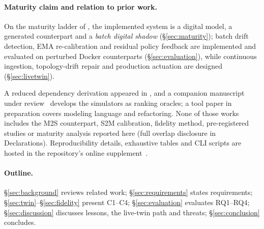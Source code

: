\paragraph{Maturity claim and relation to prior work.} On the maturity ladder of \citet{kritzinger2018digital}, the implemented system is a digital model, a generated counterpart and a \emph{batch digital shadow} (\S\ref{sec:maturity}); batch drift detection, EMA re-calibration and residual policy feedback are implemented and evaluated on perturbed Docker counterparts (\S\ref{sec:evaluation}), while continuous ingestion, topology-drift repair and production actuation are designed (\S\ref{sec:livetwin}).

A reduced dependency derivation appeared in \citet{yigit2025graph}, and a companion manuscript under review~\citep{yigit2026jss} develops the simulators as ranking oracles; a tool paper in preparation covers modeling language and refactoring. None of those works includes the M2S counterpart, S2M calibration, fidelity method, pre-registered studies or maturity analysis reported here (full overlap disclosure in Declarations). Reproducibility details, exhaustive tables and CLI scripts are hosted in the repository's online supplement~\citep{sag-software}.

\paragraph{Outline.} \S\ref{sec:background} reviews related work; \S\ref{sec:requirements} states requirements; \S\ref{sec:twin}--\S\ref{sec:fidelity} present C1--C4; \S\ref{sec:evaluation} evaluates RQ1--RQ4; \S\ref{sec:discussion} discusses lessons, the live-twin path and threats; \S\ref{sec:conclusion} concludes.
